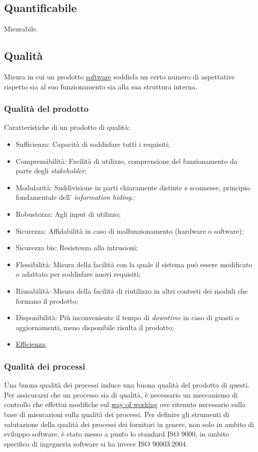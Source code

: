 	\subsection{Quantificabile}
	\label{sec:quantificabile}
	Misurabile.

	\subsection{Qualità}
	\label{sec:qualita}
	 Misura in cui un prodotto \underline{\hyperref[sec:prodottosoftware]{software}} soddisfa un certo numero di aspettative rispetto sia al suo funzionamento sia alla sua struttura interna.
	\subsubsection{Qualità del prodotto}
	\label{sec:qualitaprodotto}
	Caratteristiche di un prodotto di qualità:
	\begin{itemize}
	\item Sufficienza: Capacità di soddisfare tutti i requisiti;
	\item Comprensibilità: Facilità di utilizzo, comprensione del funzionamento da parte degli  \emph{stakeholder};
	\item Modularità: Suddivisione in parti chiaramente distinte e sconnesse, principio fondamentale dell' \emph{information hiding}.;
	\item Robustezza: Agli input di utilizzo;
	\item Sicurezza: Affidabilità in caso di malfunzionamento (hardware o software);
	\item Sicurezza bis: Resistenza alla intrusioni;
	\item Flessibilità: Misura della facilità con la quale il sistema può essere modificato o adattato per soddisfare nuovi requisiti;
	\item Riusabilità: Misura della facilità di riutilizzo in altri contesti dei moduli che formano il prodotto;
	\item Disponibilità: Più inconveniente il tempo di \emph{downtime} in caso di guasti o aggiornamenti, meno disponibile risulta il prodotto;
	\item \underline{\hyperref[sec:efficienza]{Efficienza}};
	\end{itemize}
	\subsubsection{Qualità dei processi}
	\label{sec:qualitaprocesso}
	Una buona qualità dei processi induce una buona qualità del prodotto di questi. Per assicurarsi che un processo sia di qualità, è necessario un meccanismo di controllo che effettui modifiche sul \underline{\hyperref[sec:wow]{\underline{\hyperref[sec:wow]{way of working}}}} ove ritenuto necessario sulla base di misurazioni sulla qualità dei processi. Per definire gli strumenti di valutazione della qualità dei processi dei fornitori in genere, non solo in ambito di sviluppo software, è stato messo a punto lo standard ISO 9000, in ambito specifico di ingegneria software si ha invece ISO 90003:2004.

